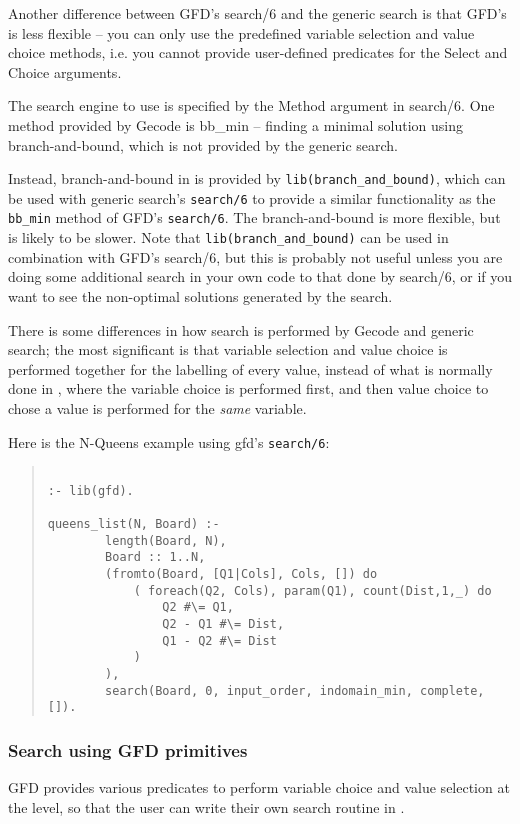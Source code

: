 Another difference between GFD's search/6 and the generic search is that 
GFD's is  less flexible -- you can only use the predefined variable 
selection and value choice methods, i.e. you cannot provide user-defined
predicates for the Select and Choice arguments. 

The search engine to use is specified by the Method argument in search/6. 
One method provided by Gecode is bb_min -- finding a minimal solution using
branch-and-bound, which is not provided by the generic search. 

Instead, branch-and-bound in \eclipse is provided by {\tt lib(branch_and_bound)}, which can
be used with generic search's {\tt search/6} to provide a similar functionality as
the {\tt bb_min} method of GFD's {\tt search/6}. The \eclipse branch-and-bound is more 
flexible, but is likely to be slower. Note that {\tt lib(branch_and_bound)} can
be used in combination with GFD's search/6, but this is probably not useful
unless you are doing some additional search in your own code to that done by 
search/6, or if you want to see the non-optimal solutions generated by the
search.

There is some differences in how search is performed by Gecode and generic
search;
the most significant is that variable selection and value choice is performed
together for the labelling of every value, instead of what is normally
done in \eclipse,
where the variable choice is performed first, and then value choice to chose
a value is performed for the {\it same} variable. 

Here is the N-Queens example using gfd's \texttt{search/6}:
\begin{quote}
\begin{verbatim}

:- lib(gfd).

queens_list(N, Board) :-
        length(Board, N),
        Board :: 1..N,
        (fromto(Board, [Q1|Cols], Cols, []) do
            ( foreach(Q2, Cols), param(Q1), count(Dist,1,_) do
                Q2 #\= Q1,
                Q2 - Q1 #\= Dist,
                Q1 - Q2 #\= Dist
            )
        ),
        search(Board, 0, input_order, indomain_min, complete, []).

\end{verbatim}
\end{quote}

\subsubsection{Search using GFD primitives}
\label{searchgfd}
GFD provides various predicates to perform variable choice
and value selection at the \eclipse level, so that the user can write their
own search routine in \eclipse. 

